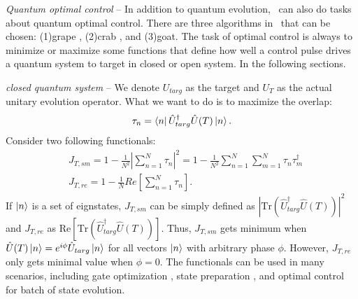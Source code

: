 \textit{Quantum optimal control} -- In addition to quantum evolution, \MindQuantum\ can also do tasks about quantum optimal control. There are three algorithms in \MindQuantum\ that can be chosen: (1)grape \cite{GRAPE_0, GRAPE_2}, (2)crab \cite{CRAB_0, CRAB_1}, and (3)goat. The task of optimal control is always to minimize or maximize some functions that define how well a control pulse drives a quantum system to target in closed or open system. In the following sections.

\textit{closed quantum system} -- We denote $U_{targ}$ as the target and $U_{T}$ as the actual unitary evolution operator. What we want to do is to maximize the overlap:
\begin{equation}
    \tau_{n}=\bra{n}\hat{U}_{targ}^{\dagger}\hat{U}(T)\ket{n}.
\end{equation}
Consider two following functionals:
\begin{equation}
    \begin{split}
        &J_{T,sm}=1-\frac{1}{N^{2}}\left|\sum_{n=1}^{N}\tau_{n}\right|^{2}=1-\frac{1}{N^{2}}\sum_{n=1}^{N}\sum_{m=1}^{N}\tau_{n}\tau_{m}^{\dagger}\\
        &J_{T,re}=1-\frac{1}{N}Re\left[\sum_{n=1}^{N}\tau_{n}\right].
    \end{split}
    \label{close}
\end{equation}
If ${\ket{n}}$ is a set of eignstates, $J_{T,sm}$ can be simply defined as $\left|\text{Tr}(\hat{U}_{targ}^{\dagger}\hat{U}(T))\right|^{2}$ and $J_{T,re}$ as $\text{Re}[\text{Tr}(\hat{U}^{\dagger}_{targ}\hat{U}(T))]$. Thus, $J_{T,sm}$ gets minimum when $\hat{U}(T)\ket{n}=e^{i\phi}\hat{U}_{targ}\ket{n}$ for all vectors $\ket{n}$ with arbitrary phase $\phi$. However, $J_{T,re}$ only gets minimal value when $\phi=0$. The functionals can be used in many scenarios, including gate optimization \cite{He_2024}, state preparation \cite{He_2021, refId0}, and optimal control for batch of state evolution.

